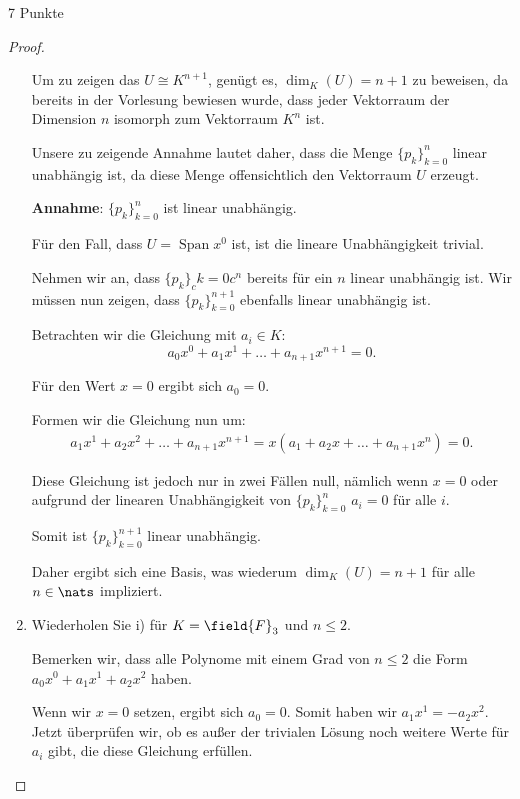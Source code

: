 \documentclass{problemset}
\begin{document}
\begin{problem}{7 Punkte}
\begin{proof}
\begin{enumerate}
              Um zu zeigen das $U \cong K^{n+1}$, genügt es, $\dim_K(U) = n + 1$ zu beweisen,
              da bereits in der Vorlesung bewiesen wurde, dass jeder Vektorraum der Dimension
              $n$ isomorph zum Vektorraum $K^n$ ist.

              Unsere zu zeigende Annahme lautet daher, dass die Menge $\{p_k\}_{k=0}^{n}$
              linear unabhängig ist, da diese Menge offensichtlich den Vektorraum $U$
              erzeugt.

              \textbf{Annahme}: $\{p_k\}_{k=0}^{n}$ ist linear unabhängig.

              Für den Fall, dass $U = \operatorname{Span}{x^0}$ ist, ist die lineare
              Unabhängigkeit trivial.

              Nehmen wir an, dass $\{p_k\}_ck=0c^{n}$ bereits für ein $n$ linear unabhängig
              ist. Wir müssen nun zeigen, dass $\{p_k\}_{k=0}^{n+1}$ ebenfalls linear
              unabhängig ist.

              Betrachten wir die Gleichung mit $a_i \in K$:
              \[
                  a_0 x^0 + a_1 x^1 + \ldots + a_{n+1} x^{n+1} = 0.
              \]

              Für den Wert $x = 0$ ergibt sich $a_0 = 0$.

              Formen wir die Gleichung nun um:
              \begin{align}
                  a_1 x^1 + a_2 x^2 + \ldots + a_{n+1}x^{n+1} = x(a_1 + a_2 x + \ldots + a_{n+1}x^n) = 0.
              \end{align}

              Diese Gleichung ist jedoch nur in zwei Fällen null, nämlich wenn $x = 0$ oder
              aufgrund der linearen Unabhängigkeit von $\{p_k\}_{k=0}^{n}$ $a_i = 0$ für alle
              $i$.

              Somit ist $\{p_k\}_{k=0}^{n+1}$ linear unabhängig.

              Daher ergibt sich eine Basis, was wiederum $\dim_K(U) = n + 1$ für alle $n \in
                  \nats$ impliziert. \checkmark

        \item Wiederholen Sie i) für $K = \field{F}_3$ und $n \leq 2$.

              Bemerken wir, dass alle Polynome mit einem Grad von $n \leq 2$ die Form $a_0x^0
                  + a_1x^1 + a_2x^2$ haben.

              Wenn wir $x = 0$ setzen, ergibt sich $a_0 = 0$. Somit haben wir $a_1x^1 = -
                  a_2x^2$. Jetzt überprüfen wir, ob es außer der trivialen Lösung noch weitere
              Werte für $a_i$ gibt, die diese Gleichung erfüllen.


\end{enumerate}
\end{proof}
\end{problem}
\end{document}
